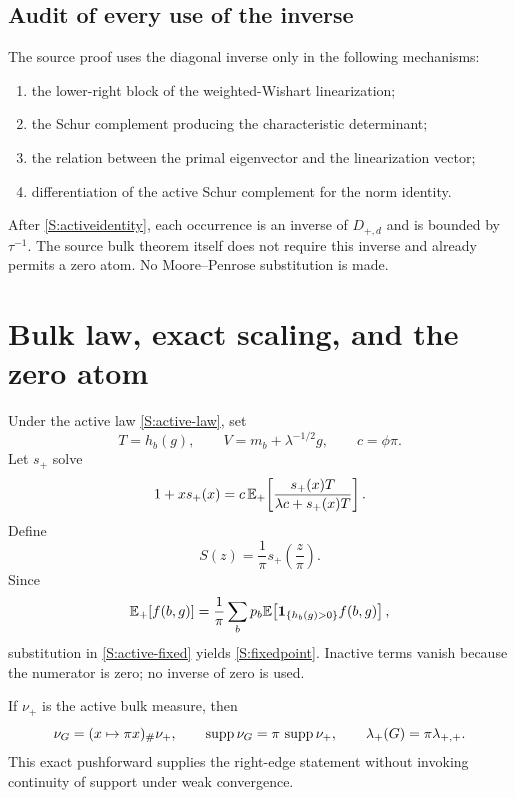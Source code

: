 \documentclass[
  aps,
  prl,
  10pt,
  onecolumn,
  longbibliography,
  nofootinbib
]{revtex4-2}
\theoremstyle{remark}
\begin{document}
\subsection{Audit of every use of the inverse}

The source proof uses the diagonal inverse only in the following mechanisms:
\begin{enumerate}
\item the lower-right block of the weighted-Wishart linearization;
\item the Schur complement producing the characteristic determinant;
\item the relation between the primal eigenvector and the linearization vector;
\item differentiation of the active Schur complement for the norm identity.
\end{enumerate}
After \eqref{S:activeidentity}, each occurrence is an inverse of $D_{+,d}$ and is bounded by $\tau^{-1}$. The source bulk theorem itself does not require this inverse and already permits a zero atom. No Moore--Penrose substitution is made.

\section{Bulk law, exact scaling, and the zero atom}

Under the active law \eqref{S:active-law}, set
\begin{equation}
T=h_b(g),\qquad V=m_b+\lambda^{-1/2}g,\qquad c=\phi\pi.
\end{equation}
Let $s_+$ solve
\begin{equation}
1+xs_+(x)
=
c\,\mathbb{E}_+\!\left[
\frac{s_+(x)T}{\lambda c+s_+(x)T}
\right].
\label{S:active-fixed}
\end{equation}
Define
\begin{equation}
S(z)=\frac1\pi s_+\!\left(\frac z\pi\right).
\label{S:Sscale}
\end{equation}
Since
\begin{equation}
\mathbb{E}_+[f(b,g)]
=
\frac1\pi\sum_bp_b
\mathbb{E}\!\left[\mathbf{1}_{\{h_b(g)>0\}}f(b,g)\right],
\end{equation}
substitution in \eqref{S:active-fixed} yields \eqref{S:fixedpoint}. Inactive terms vanish because the numerator is zero; no inverse of zero is used.

If $\nu_+$ is the active bulk measure, then
\begin{equation}
\nu_G=(x\mapsto\pi x)_\#\nu_+,
\qquad
\operatorname{supp}\nu_G=\pi\,\operatorname{supp}\nu_+,
\qquad
\lambda_+(G)=\pi\lambda_{+,+}.
\label{S:pushforward}
\end{equation}
This exact pushforward supplies the right-edge statement without invoking continuity of support under weak convergence.
\end{document}
